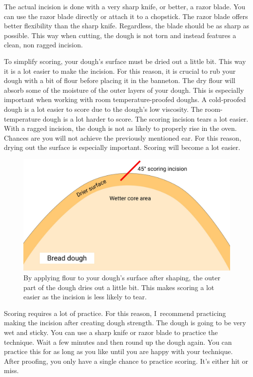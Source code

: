 The actual incision is done with a very sharp knife, or better, a razor
blade. You can use the razor blade directly or attach it to a chopstick.
The razor blade offers better flexibility than the sharp knife.
Regardless, the blade should be as sharp as possible. This way when cutting,
the dough is not torn and instead features a clean, non ragged incision.

To simplify scoring, your dough's surface must be dried out a little bit.
This way it is a lot easier to make the incision.
For this reason, it is crucial to rub your dough with a bit of flour
before placing it in the banneton. The dry flour will absorb some of the
moisture of the outer layers of your dough. This is especially important
when working with room temperature-proofed doughs. A cold-proofed dough
is a lot easier to score due to the dough's low viscosity. The room-temperature
dough is a lot harder to score. The scoring incision tears a lot
easier. With a ragged incision, the dough is not as likely to properly
rise in the oven. Chances are you will not achieve the previously mentioned
ear. For this reason, drying out the surface is especially important. Scoring
will become a lot easier.

\begin{figure}[htb!]
  \includegraphics[width=\textwidth]{dry-dough-surface}
  \caption{By applying flour to your dough's surface after shaping, the outer part
  of the dough dries out a little bit. This makes scoring a lot easier as the incision
  is less likely to tear.}%
  \label{fig:dried-out-dough-scoring}
\end{figure}


Scoring requires a lot of practice. For this reason, I~recommend
practicing making the incision after creating dough strength. The dough
is going to be very wet and sticky. You can use a sharp knife or razor
blade to practice the technique. Wait a few minutes and then round
up the dough again. You can practice this for as long as you like
until you are happy with your technique. After proofing, you only
have a single chance to practice scoring. It's either hit or miss.

